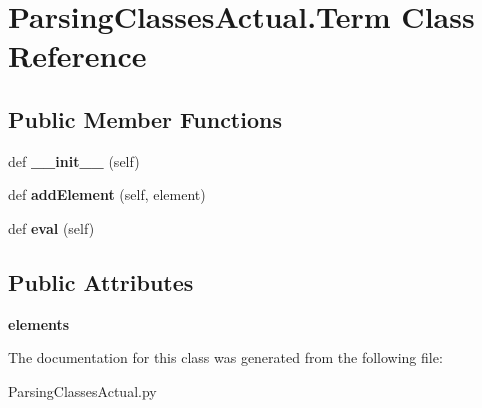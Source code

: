 \hypertarget{class_parsing_classes_actual_1_1_term}{}\section{Parsing\+Classes\+Actual.\+Term Class Reference}
\label{class_parsing_classes_actual_1_1_term}
\subsection*{Public Member Functions}
\begin{DoxyCompactItemize}
\item 
\mbox{\label{class_parsing_classes_actual_1_1_term_a59155d0cbc1245f862052b47fd257739}} 
def {\bfseries \+\_\+\+\_\+init\+\_\+\+\_\+} (self)
\item 
\mbox{\label{class_parsing_classes_actual_1_1_term_adaa3917c680bb2cc250b23f02333f03a}} 
def {\bfseries add\+Element} (self, element)
\item 
\mbox{\label{class_parsing_classes_actual_1_1_term_a3fbb50911cfcdfdb1453c0882cf82cc5}} 
def {\bfseries eval} (self)
\end{DoxyCompactItemize}
\subsection*{Public Attributes}
\begin{DoxyCompactItemize}
\item 
\mbox{\label{class_parsing_classes_actual_1_1_term_a5281bd694526cb3549ca900f49628b51}} 
{\bfseries elements}
\end{DoxyCompactItemize}


The documentation for this class was generated from the following file\+:\begin{DoxyCompactItemize}
\item 
Parsing\+Classes\+Actual.\+py\end{DoxyCompactItemize}
